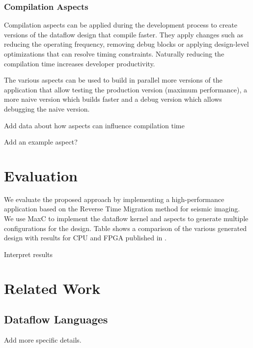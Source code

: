 \subsubsection{Compilation Aspects}

Compilation aspects can be applied during the development process to
create versions of the dataflow design that compile faster. They apply
changes such as reducing the operating frequency, removing debug
blocks or applying design-level optimizations that can resolve timing
constraints. Naturally reducing the compilation time increases
developer productivity.

The various aspects can be used to build in parallel more versions of
the application that allow testing the production version (maximum
performance), a more naive version which builds faster and a debug
version which allows debugging the naive version.

\TODO Add data about how aspects can influence compilation time

\TODO Add an example aspect?


\section{Evaluation}

We evaluate the proposed approach by implementing a high-performance
application based on the Reverse Time Migration method for seismic
imaging. We use MaxC to implement the dataflow kernel and aspects to
generate multiple configurations for the design. Table shows a
comparison of the various generated design with results for CPU and
FPGA published in \cite{Xinyu:Qiwei:Luk:Qiang:Pell:2012}.

\TODO Interpret results

\section{Related Work}


\subsection{Dataflow Languages}

\TODO Add more specific details.

